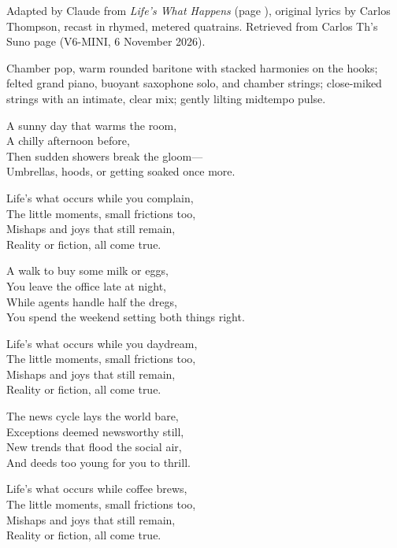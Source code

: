 
\label{sec:lifes-what-occurs}
\begin{notes}
Adapted by Claude from \emph{Life's What Happens} (page \pageref{sec:lifes-what-happens}), original lyrics by Carlos Thompson, recast in rhymed, metered quatrains. Retrieved from Carlos Th's Suno page (V6-MINI, 6 November 2026).
\end{notes}
\begin{style}
Chamber pop, warm rounded baritone with stacked harmonies on the hooks; felted grand piano, buoyant saxophone solo, and chamber strings; close-miked strings with an intimate, clear mix; gently lilting midtempo pulse.
\end{style}
\begin{lyrics}
A sunny day that warms the room,\\
A chilly afternoon before,\\
Then sudden showers break the gloom—\\
Umbrellas, hoods, or getting soaked once more.

Life’s what occurs while you complain,\\
The little moments, small frictions too,\\
Mishaps and joys that still remain,\\
Reality or fiction, all come true.

A walk to buy some milk or eggs,\\
You leave the office late at night,\\
While agents handle half the dregs,\\
You spend the weekend setting both things right.

Life’s what occurs while you daydream,\\
The little moments, small frictions too,\\
Mishaps and joys that still remain,\\
Reality or fiction, all come true.

The news cycle lays the world bare,\\
Exceptions deemed newsworthy still,\\
New trends that flood the social air,\\
And deeds too young for you to thrill.

Life’s what occurs while coffee brews,\\
The little moments, small frictions too,\\
Mishaps and joys that still remain,\\
Reality or fiction, all come true.


\end{lyrics}
